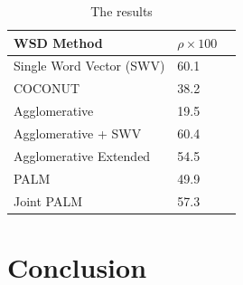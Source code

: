 \documentclass[11pt]{article}
\begin{document}
\begin{table}
\center
    \begin{tabular}{|l|l|l|}
    \hline
    WSD Method & $\rho \times 100$ \\ \hline
    Single Word Vector (SWV) & 60.1 \\ \hline
    COCONUT & 38.2 \\ \hline
    Agglomerative & 19.5 \\ \hline
    Agglomerative + SWV & 60.4 \\ \hline
    Agglomerative Extended & 54.5 \\ \hline
    PALM & 49.9 \\ \hline
    Joint PALM & 57.3 \\ \hline
    \end{tabular}
    \caption{The results}
\end{table}

\section{Conclusion}



\end{document}

